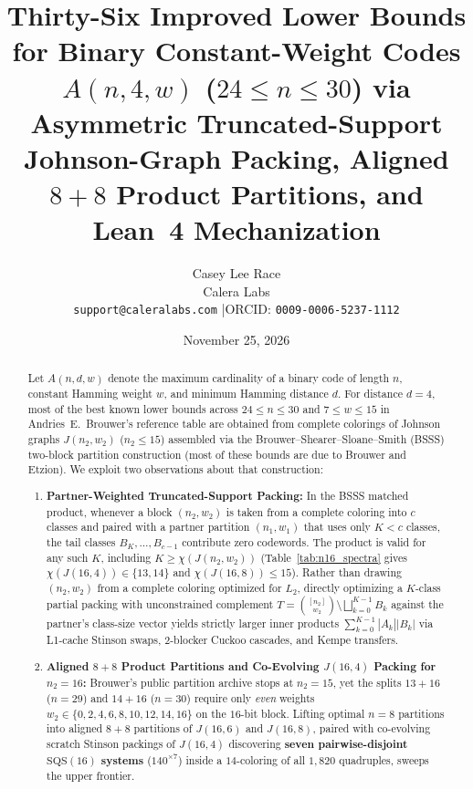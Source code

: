\documentclass[11pt,letterpaper]{article}
\title{\textbf{Thirty-Six Improved Lower Bounds for Binary Constant-Weight Codes $A(n, 4, w)$ ($24 \le n \le 30$) via Asymmetric Truncated-Support Johnson-Graph Packing, Aligned $8{+}8$ Product Partitions, and Lean~4 Mechanization}}
\author{Casey Lee Race\\
\small Calera Labs\\
\small \texttt{support@caleralabs.com} \quad|\quad ORCID: \texttt{0009-0006-5237-1112}}
\date{November 25, 2026}
\theoremstyle{plain}
\theoremstyle{definition}
\theoremstyle{remark}
\begin{document}
\maketitle

\begin{abstract}
Let $A(n, d, w)$ denote the maximum cardinality of a binary code of length $n$, constant Hamming weight $w$, and minimum Hamming distance $d$. For distance $d = 4$, most of the best known lower bounds across $24 \le n \le 30$ and $7 \le w \le 15$ in Andries~E.\ Brouwer's reference table are obtained from complete colorings of Johnson graphs $J(n_2, w_2)$ ($n_2 \le 15$) assembled via the Brouwer--Shearer--Sloane--Smith (BSSS) two-block partition construction (most of these bounds are due to Brouwer and Etzion). We exploit two observations about that construction:
\begin{enumerate}[leftmargin=1.6em,itemsep=1pt,topsep=3pt]
    \item \textbf{Partner-Weighted Truncated-Support Packing:} In the BSSS matched product, whenever a block $(n_2, w_2)$ is taken from a complete coloring into $c$ classes and paired with a partner partition $(n_1, w_1)$ that uses only $K < c$ classes, the tail classes $B_K, \dots, B_{c-1}$ contribute zero codewords. The product is valid for any such $K$, including $K \ge \chi(J(n_2, w_2))$ (Table~\ref{tab:n16_spectra} gives $\chi(J(16,4)) \in \{13, 14\}$ and $\chi(J(16,8)) \le 15$). Rather than drawing $(n_2, w_2)$ from a complete coloring optimized for $L_2$, directly optimizing a $K$-class partial packing with unconstrained complement $T = \binom{[n_2]}{w_2} \setminus \bigsqcup_{k=0}^{K-1} B_k$ against the partner's class-size vector yields strictly larger inner products $\sum_{k=0}^{K-1} |A_k||B_k|$ via L1-cache Stinson swaps, $2$-blocker Cuckoo cascades, and Kempe transfers.
    \item \textbf{Aligned $8{+}8$ Product Partitions and Co-Evolving $J(16, 4)$ Packing for $n_2 = 16$:} Brouwer's public partition archive stops at $n_2 = 15$, yet the splits $13{+}16$ ($n = 29$) and $14{+}16$ ($n = 30$) require only \emph{even} weights $w_2 \in \{0, 2, 4, 6, 8, 10, 12, 14, 16\}$ on the $16$-bit block. Lifting optimal $n = 8$ partitions into aligned $8{+}8$ partitions of $J(16, 6)$ and $J(16, 8)$, paired with co-evolving scratch Stinson packings of $J(16, 4)$ discovering \textbf{seven pairwise-disjoint $\mathrm{SQS}(16)$ systems} ($140^{\times 7}$) inside a $14$-coloring of all $1{,}820$ quadruples, sweeps the upper frontier.
\end{enumerate}

\end{abstract}
\end{document}
